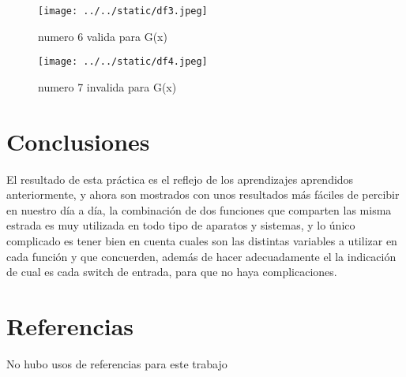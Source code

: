\documentclass{article}
\begin{document}
\begin{multicols}{2}
\begin{figure}[H]
	\centering	
	\texttt{[image: ../../static/df3.jpeg]}
	\caption{numero 6 valida para G(x)}
	\label{fig:3}
\end{figure}

\begin{figure}[H]
	\centering	
	\texttt{[image: ../../static/df4.jpeg]}
	\caption{numero 7 invalida para G(x)}
	\label{fig:4}
\end{figure}



\section{Conclusiones}\label{sec:conclusion}
El resultado de esta práctica es el reflejo de los aprendizajes aprendidos anteriormente, y ahora son mostrados con unos resultados más fáciles de percibir en nuestro día a día, la combinación de dos funciones que comparten las misma estrada es muy utilizada en todo tipo de aparatos y sistemas, y lo único complicado es tener bien en cuenta cuales son las distintas variables a utilizar en cada función y que concuerden, además de hacer adecuadamente el la indicación de cual es cada switch de entrada, para que no haya complicaciones.
\section*{Referencias}\label{sec:referencias}	
No hubo usos de referencias para este trabajo
\end{multicols}
\end{document}
